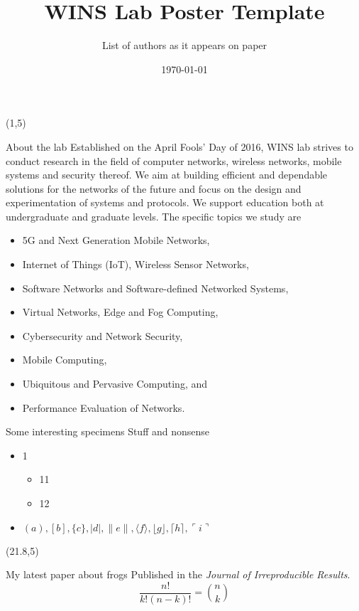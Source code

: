 \documentclass[14pt,final]{beamer}
\title{WINS Lab Poster Template}
\author{List of authors as it appears on paper}
\date{\today}
\begin{document}
\begin{frame}{} 

\begin{textblock}{19.5}(1,5)
\begin{block}{About the lab\cite{einstein} } Established on the April Fools’ Day of 2016, WINS lab strives to conduct research in the field of computer networks, wireless networks, mobile systems and security thereof. We aim at building efficient and dependable solutions for the networks of the future and focus on the design and experimentation of systems and protocols. We support education both at undergraduate and graduate levels. The specific topics we study are
\begin{itemize}
\item     5G and Next Generation Mobile Networks,
\item    Internet of Things (IoT), Wireless Sensor Networks,
\item    Software Networks and Software-defined Networked Systems,
\item    Virtual Networks, Edge and Fog Computing,
\item    Cybersecurity and Network Security,
\item    Mobile Computing,
\item    Ubiquitous and Pervasive Computing, and
\item    Performance Evaluation of Networks.
\end{itemize}

\end{block}

\begin{block}{Some interesting specimens}
Stuff and nonsense
\begin{itemize}
\item 1
\begin{itemize}
\item 11
\item 12
\end{itemize}
\item $( a ), [ b ], \{ c \}, | d |, \| e \|,
\langle f \rangle, \lfloor g \rfloor,
\lceil h \rceil, \ulcorner i \urcorner$ \cite{knuthwebsite}
\end{itemize}

\end{block}
\end{textblock}

\begin{textblock}{19.3}(21.8,5)
\begin{block}{My latest paper about frogs}
Published in the \emph{Journal of Irreproducible Results}.
$$
\frac{n!}{k!(n-k)!} = \binom{n}{k}
$$
\end{block}


\end{textblock}
\end{frame}
\end{document}
